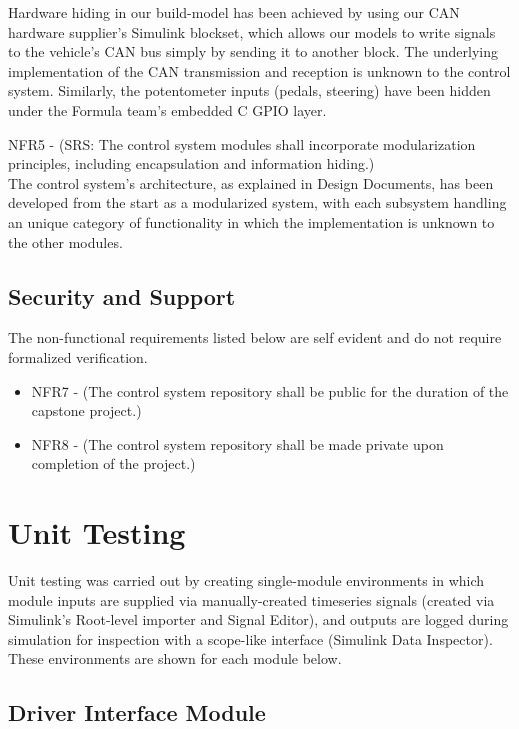 \documentclass[12pt, titlepage]{article}
\begin{document}
Hardware hiding in our build-model has been achieved by using our CAN hardware supplier's Simulink blockset, which allows our models to write signals to the vehicle's CAN bus simply by sending it to another block. The underlying implementation of the CAN transmission and reception is unknown to the control system. Similarly, the potentometer inputs (pedals, steering) have been hidden under the Formula team's embedded C GPIO layer.

NFR5 - (SRS: The control system modules shall incorporate modularization principles,
including encapsulation and information hiding.)\\

The control system's architecture, as explained in Design Documents, has been developed from the start as a modularized system, with each subsystem handling an unique category of functionality in which the implementation is unknown to the other modules.

\subsection{Security and Support}

The non-functional requirements listed below are self evident and do not require formalized verification.

\begin{itemize}
    \item NFR7 - (The control system repository shall be public for the duration of the capstone project.)
    \item NFR8 - (The control system repository shall be made private upon completion of the project.)
\end{itemize}

\newpage

\section{Unit Testing}

Unit testing was carried out by creating single-module environments in which module inputs are supplied via manually-created timeseries signals (created via Simulink's Root-level importer and Signal Editor), and outputs are logged during simulation for inspection with a scope-like interface (Simulink Data Inspector). These environments are shown for each module below.

\subsection{Driver Interface Module}
\end{document}
